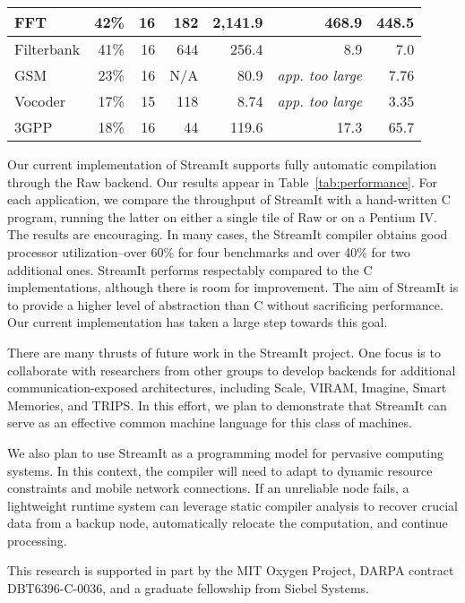 \begin{table*}[t]
\begin{center}
\begin{tabular}{|l||r|r|r|r||r||r||}
FFT    & 42\% & 16  & 182 &  2,141.9 & 468.9 & 448.5  \\ \hline
Filterbank & 
       41\% & 16  &  644 &   256.4  & 8.9 & 7.0   \\ \hline
GSM    & 23\% & 16 & N/A &    80.9  & {\it app. too large} & 7.76 \\ \hline
Vocoder& 17\% & 15  & 118 &     8.74  & {\it app. too large} & 3.35  \\ \hline
3GPP   & 18\% & 16  & 44 &   119.6  & 17.3  & 65.7   \\ \hline \hline
\end{tabular}
\vspace{-6pt}
\caption{\protect\small Performance Results.}
\label{tab:performance}
\end{center}
\vspace{-12pt}
\end{table*}

Our current implementation of StreamIt supports fully automatic
compilation through the Raw backend.  Our results appear in
Table~\ref{tab:performance}.  For each application, we compare the
throughput of StreamIt with a hand-written C program, running the
latter on either a single tile of Raw or on a Pentium IV.  The results
are encouraging.  In many cases, the StreamIt compiler obtains good
processor utilization--over 60\% for four benchmarks and over 40\% for
two additional ones.  StreamIt performs respectably compared to the C
implementations, although there is room for improvement.  The aim of
StreamIt is to provide a higher level of abstraction than C without
sacrificing performance.  Our current implementation has taken a large
step towards this goal.

There are many thrusts of future work in the StreamIt project.  One
focus is to collaborate with researchers from other groups to develop
backends for additional communication-exposed architectures, including
Scale, VIRAM, Imagine, Smart Memories, and TRIPS.  In this effort, we
plan to demonstrate that StreamIt can serve as an effective common
machine language for this class of machines.

We also plan to use StreamIt as a programming model for pervasive
computing systems.  In this context, the compiler will need to adapt
to dynamic resource constraints and mobile network connections.  If an
unreliable node fails, a lightweight runtime system can leverage
static compiler analysis to recover crucial data from a backup node,
automatically relocate the computation, and continue processing.

This research is supported in part by the MIT Oxygen Project, DARPA
contract DBT6396-C-0036, and a graduate fellowship from Siebel Systems.

